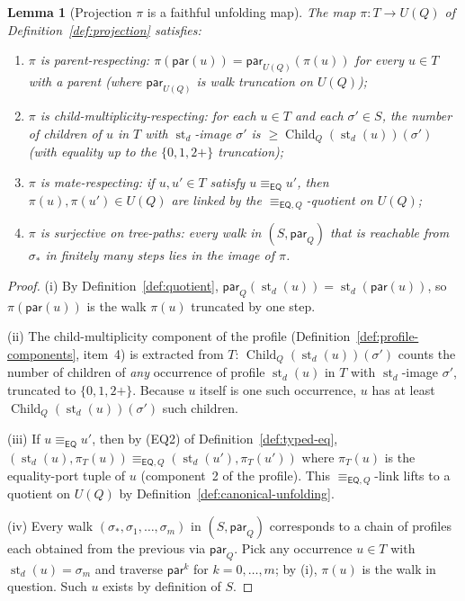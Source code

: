 \documentclass[11pt]{article}
\newtheorem{lemma}[theorem]{Lemma}
\theoremstyle{definition}
\theoremstyle{remark}
\newcommand{\EQ}{\mathsf{EQ}}
\newcommand{\st}{\operatorname{st}}
\newcommand{\Child}{\operatorname{Child}}
\newcommand{\eqcong}{\equiv_{\EQ}}
\newcommand{\eqQ}{\equiv_{\EQ,Q}}
\begin{document}
\begin{lemma}[Projection $\pi$ is a faithful unfolding map]
\label{lem:pi-faithful}
The map $\pi : T \to U(Q)$ of
Definition~\ref{def:projection} satisfies:
\begin{enumerate}[label=(\roman*),leftmargin=2em]
\item $\pi$ is parent-respecting:
  $\pi(\mathsf{par}(u)) = \mathsf{par}_{U(Q)}(\pi(u))$ for every
  $u\in T$ with a parent (where $\mathsf{par}_{U(Q)}$ is walk
  truncation on $U(Q)$);
\item $\pi$ is child-multiplicity-respecting: for each $u\in T$ and
  each $\sigma'\in S$, the number of children of $u$ in $T$ with
  $\st_d$-image $\sigma'$ is $\ge \Child_Q(\st_d(u))(\sigma')$
  (with equality up to the $\{0,1,2{+}\}$ truncation);
\item $\pi$ is mate-respecting: if $u,u'\in T$ satisfy
  $u\eqcong u'$, then $\pi(u),\pi(u')\in U(Q)$ are linked by the
  $\eqQ$-quotient on $U(Q)$;
\item $\pi$ is surjective on tree-paths: every walk in
  $(S,\mathsf{par}_Q)$ that is reachable from $\sigma_\ast$ in
  finitely many steps lies in the image of $\pi$.
\end{enumerate}
\end{lemma}

\begin{proof}
(i) By Definition~\ref{def:quotient},
$\mathsf{par}_Q(\st_d(u))=\st_d(\mathsf{par}(u))$, so
$\pi(\mathsf{par}(u))$ is the walk $\pi(u)$ truncated by one step.

(ii) The child-multiplicity component of the profile
(Definition~\ref{def:profile-components}, item~4) is extracted from
$T$: $\Child_Q(\st_d(u))(\sigma')$ counts the number of children of
\emph{any} occurrence of profile $\st_d(u)$ in $T$ with $\st_d$-image
$\sigma'$, truncated to $\{0,1,2{+}\}$.  Because $u$ itself is one
such occurrence, $u$ has at least $\Child_Q(\st_d(u))(\sigma')$ such
children.

(iii) If $u\eqcong u'$, then by (EQ2) of
Definition~\ref{def:typed-eq},
$(\st_d(u),\pi_T(u))\eqQ(\st_d(u'),\pi_T(u'))$ where $\pi_T(u)$ is
the equality-port tuple of $u$ (component~2 of the profile).  This
$\eqQ$-link lifts to a quotient on $U(Q)$ by
Definition~\ref{def:canonical-unfolding}.

(iv) Every walk $(\sigma_\ast,\sigma_1,\ldots,\sigma_m)$ in
$(S,\mathsf{par}_Q)$ corresponds to a chain of profiles each obtained
from the previous via $\mathsf{par}_Q$.  Pick any occurrence $u\in T$
with $\st_d(u) = \sigma_m$ and traverse $\mathsf{par}^k$ for
$k=0,\ldots,m$; by (i), $\pi(u)$ is the walk in question.  Such $u$
exists by definition of $S$.
\end{proof}
\end{document}
